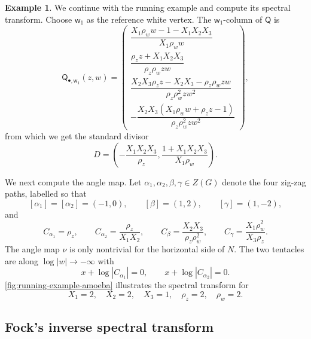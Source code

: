 \documentclass[12pt]{amsart}
\numberwithin{equation}{section}
\theoremstyle{definition}
\newtheorem{example}[theorem]{Example}
\def\casimir{C}
\def\bw{\mathsf{w}}
\def\bQ{\mathsf{Q}}
\def\zzG{{{Z}(G)}}
\begin{document}
\begin{example}
We continue with the running example and compute its spectral transform. Choose $\bw_1$ as the reference white vertex. The
$\bw_1$-column of $\bQ$ is
\[
\bQ_{\bullet,\bw_1}(z,w)
=
\begin{pmatrix}
\dfrac{
X_1\rho_w w-1-X_1X_2X_3
}{
X_1\rho_w w
}
\\[4mm]
\dfrac{
\rho_z z+X_1X_2X_3
}{
\rho_z\rho_w zw
}
\\[4mm]
\dfrac{
X_2X_3\rho_z z-X_2X_3-\rho_z\rho_w zw
}{
\rho_z\rho_w^2zw^2
}
\\[4mm]
-\dfrac{
X_2X_3
\left(
X_1\rho_w w+\rho_z z-1
\right)
}{
\rho_z\rho_w^2zw^2
}
\end{pmatrix},
\]
from which we get the standard divisor
\[
D=\left(
-\frac{X_1X_2X_3}{\rho_z},
\frac{1+X_1X_2X_3}{X_1\rho_w}\right).
\]

We next compute the angle map.  Let
$
\alpha_1,\alpha_2,\beta,\gamma\in\zzG
$
denote the four zig-zag paths, labelled so that
\[
[\alpha_1]=[\alpha_2]=(-1,0),
\qquad
[\beta]=(1,2),
\qquad
[\gamma]=(1,-2),
\]
and 
\[
\casimir_{\alpha_1}
=
{\rho_z},
\qquad
\casimir_{\alpha_2}
=
\frac{\rho_z}{X_1X_2},
\qquad
\casimir_{\beta}
=
\frac{X_2X_3}{\rho_z\rho_w^2},
\qquad
\casimir_{\gamma}
=
\frac{X_1\rho_w^2}{X_3\rho_z}.
\]
The angle map $\nu$ is only nontrivial for the horizontal side of $N$. The two tentacles are along $\log|w| \to -\infty$ with
\[
x + \log|C_{\alpha_1}|=0, \qquad x + \log|C_{\alpha_2}|=0.
\]
\cref{fig:running-example-amoeba} illustrates the spectral transform for
\[
X_1 = 2,\quad X_2 = 2,\quad X_3 = 1,\quad \rho_z = 2,\quad \rho_w = 2.
\]
\end{example}













\subsection{Fock's inverse spectral transform}
\label{sec:fock_weights}
\end{document}
